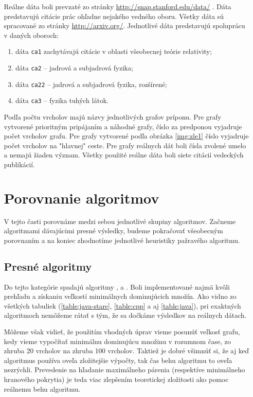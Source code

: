 Reálne dáta boli prevzaté zo stránky \url{http://snap.stanford.edu/data/} 
\citep{snapnets}. Dáta predstavujú citácie prác ohľadne nejakého vedného oboru. 
Všetky dáta sú spracované zo stránky \url{http://arxiv.org/}. Jednotlivé dáta 
predstavujú spoluprácu v daných oboroch:
\begin{enumerate}
	\item dáta \texttt{ca1} zachytávajú citácie v oblasti všeobecnej teórie relativity;
	\item dáta \texttt{ca2} -- jadrová a subjadrová fyzika;
	\item dáta \texttt{ca22} -- jadrová a subjadrová fyzika, rozšírené;
	\item dáta \texttt{ca3} -- fyzika tuhých látok.
\end{enumerate}

Podľa počtu vrcholov majú názvy jednotlivých grafov príponu. Pre grafy 
vytvorené prioritným pripájaním a náhodné grafy, číslo za predponou vyjadruje 
počet vrcholov grafu. Pre grafy vytvorené podľa obrázka \ref{img:zle1} číslo 
vyjadruje počet vrcholov na "hlavnej" ceste. Pre grafy reálnych dát boli čísla 
zvolené umelo a nemajú žiaden význam. Všetky použité reálne dáta boli siete 
citácií vedeckých publikácií.

\section{Porovnanie algoritmov}

V tejto časti porovnáme medzi sebou jednotlivé skupiny algoritmov. Začneme 
algoritmami dávajúcimi presné výsledky, budeme pokračovať všeobecným porovnaním 
a na koniec zhodnotíme jednotlivé heuristiky pažravého algoritmu.

\subsection{Presné algoritmy}

Do tejto kategórie spadajú algoritmy ,  a . 
Boli implementované najmä kvôli prehľadu a získaniu veľkostí minimálnych 
dominujúcich množín. Ako vidno zo všetkých tabuliek (\ref{table:java-stare}, 
\ref{table:cpp} a aj \ref{table:java}), pri exaktných algoritmoch nemôžeme 
rátať s tým, že sa dočkáme výsledkov na reálnych dátach.

Môžeme však vidieť, že použitím vhodných úprav vieme posunúť veľkosť grafu, 
kedy vieme vypočítať minimálnu dominujúcu množinu v rozumnom čase, zo zhruba 
20 vrcholov na zhruba 100 vrcholov. Taktiež je dobré všimnúť si, že aj keď 
algoritmus  používa oveľa zložitejšie výpočty, tak čas behu 
algoritmu to oveľa nezrýchli. Prevedenie na hľadanie maximálneho párenia 
(respektíve minimálneho hranového pokrytia) je teda viac zlepšením teoretickej 
zložitosti ako pomoc reálnemu behu algoritmu.

